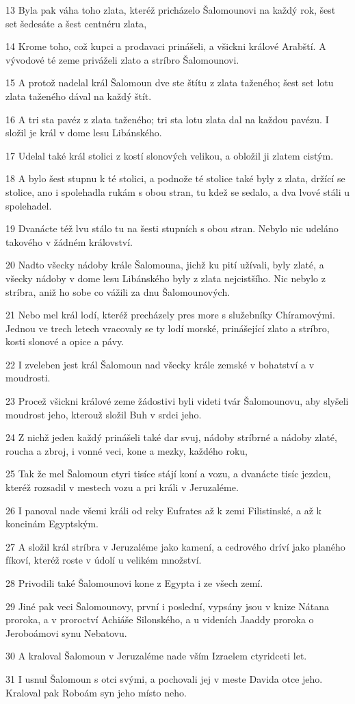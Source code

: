 \par 13 Byla pak váha toho zlata, kteréž pricházelo Šalomounovi na každý rok, šest set šedesáte a šest centnéru zlata,
\par 14 Krome toho, což kupci a prodavaci prinášeli, a všickni králové Arabští. A vývodové té zeme priváželi zlato a stríbro Šalomounovi.
\par 15 A protož nadelal král Šalomoun dve ste štítu z zlata taženého; šest set lotu zlata taženého dával na každý štít.
\par 16 A tri sta pavéz z zlata taženého; tri sta lotu zlata dal na každou pavézu. I složil je král v dome lesu Libánského.
\par 17 Udelal také král stolici z kostí slonových velikou, a obložil ji zlatem cistým.
\par 18 A bylo šest stupnu k té stolici, a podnože té stolice také byly z zlata, držící se stolice, ano i spolehadla rukám s obou stran, tu kdež se sedalo, a dva lvové stáli u spolehadel.
\par 19 Dvanácte též lvu stálo tu na šesti stupních s obou stran. Nebylo nic udeláno takového v žádném království.
\par 20 Nadto všecky nádoby krále Šalomouna, jichž ku pití užívali, byly zlaté, a všecky nádoby v dome lesu Libánského byly z zlata nejcistšího. Nic nebylo z stríbra, aniž ho sobe co vážili za dnu Šalomounových.
\par 21 Nebo mel král lodí, kteréž precházely pres more s služebníky Chíramovými. Jednou ve trech letech vracovaly se ty lodí morské, prinášející zlato a stríbro, kosti slonové a opice a pávy.
\par 22 I zveleben jest král Šalomoun nad všecky krále zemské v bohatství a v moudrosti.
\par 23 Procež všickni králové zeme žádostivi byli videti tvár Šalomounovu, aby slyšeli moudrost jeho, kterouž složil Buh v srdci jeho.
\par 24 Z nichž jeden každý prinášeli také dar svuj, nádoby stríbrné a nádoby zlaté, roucha a zbroj, i vonné veci, kone a mezky, každého roku,
\par 25 Tak že mel Šalomoun ctyri tisíce stájí koní a vozu, a dvanácte tisíc jezdcu, kteréž rozsadil v mestech vozu a pri králi v Jeruzaléme.
\par 26 I panoval nade všemi králi od reky Eufrates až k zemi Filistinské, a až k koncinám Egyptským.
\par 27 A složil král stríbra v Jeruzaléme jako kamení, a cedrového dríví jako planého fíkoví, kteréž roste v údolí u velikém množství.
\par 28 Privodili také Šalomounovi kone z Egypta i ze všech zemí.
\par 29 Jiné pak veci Šalomounovy, první i poslední, vypsány jsou v knize Nátana proroka, a v proroctví Achiáše Silonského, a u videních Jaaddy proroka o Jeroboámovi synu Nebatovu.
\par 30 A kraloval Šalomoun v Jeruzaléme nade vším Izraelem ctyridceti let.
\par 31 I usnul Šalomoun s otci svými, a pochovali jej v meste Davida otce jeho. Kraloval pak Roboám syn jeho místo neho.

